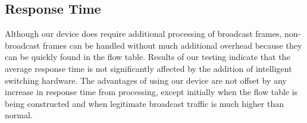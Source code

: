     \subsection{Response Time}
	Although our device does require additional processing of broadcast frames, non-broadcast frames can be handled without much additional overhead because they can be quickly found in the flow table.
	Results of our testing indicate that the average response time is not significantly affected by the addition of intelligent switching hardware.
	The advantages of using our device are not offset by any increase in response time from processing, except initially when the flow table is being constructed and when legitimate broadcast traffic is much higher than normal.

